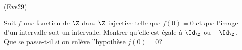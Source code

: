 \begin{tiny}(Evs29)\end{tiny} Soit $f$ une fonction de $\Z$ dans $\Z$ injective telle que $f(0)= 0$ et que l'image d'un intervalle soit un intervalle. Montrer qu'elle est égale à $\Id_\Z$ ou $-\Id_\Z$. Que se passe-t-il si on enlève l'hypothèse $f(0)=0$?